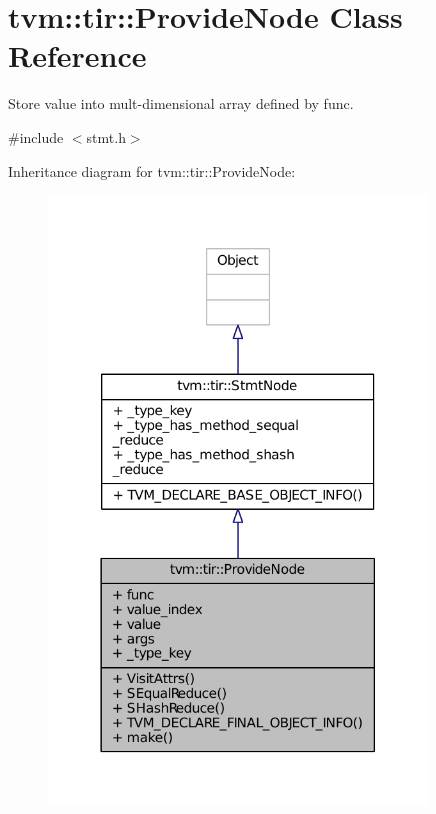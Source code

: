 \hypertarget{classtvm_1_1tir_1_1ProvideNode}{}\section{tvm\+:\+:tir\+:\+:Provide\+Node Class Reference}
\label{classtvm_1_1tir_1_1ProvideNode}


Store value into mult-\/dimensional array defined by func.  




{\ttfamily \#include $<$stmt.\+h$>$}



Inheritance diagram for tvm\+:\+:tir\+:\+:Provide\+Node\+:
\nopagebreak
\begin{figure}[H]
\begin{center}
\leavevmode
\includegraphics[width=285pt]{classtvm_1_1tir_1_1ProvideNode__inherit__graph}
\end{center}
\end{figure}


